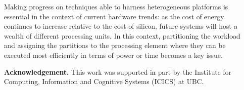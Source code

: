 \documentclass{llncs}
\begin{document}
Making progress on techniques able to harness heterogeneous platforms is essential in the context of current hardware trends: as the cost of energy continues to increase relative to the cost of silicon, future systems will host a wealth of different processing units. In this context, partitioning the workload and assigning the partitions to the processing element where they can be executed most efficiently in terms of power or time becomes a key issue.

\textbf{Acknowledgement.} This work was supported in part by the Institute for Computing, Information and Cognitive Systems (ICICS) at UBC.


\end{document}

